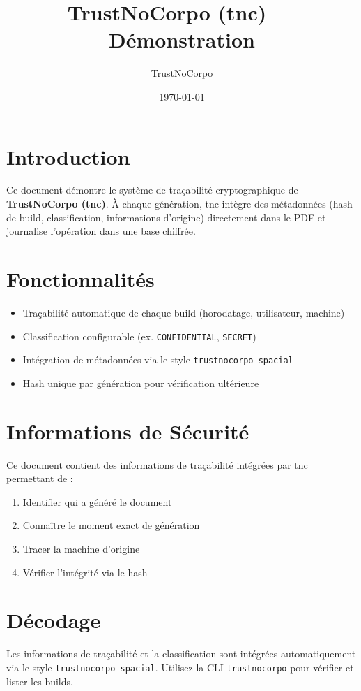 \documentclass[11pt]{article}
\title{TrustNoCorpo (tnc) — Démonstration}
\author{TrustNoCorpo}
\date{\today}
\begin{document}
\maketitle

\section{Introduction}

Ce document démontre le système de traçabilité cryptographique de \textbf{TrustNoCorpo (tnc)}. À chaque génération, tnc intègre des métadonnées (hash de build, classification, informations d'origine) directement dans le PDF et journalise l'opération dans une base chiffrée.

\section{Fonctionnalités}

\begin{itemize}
    \item Traçabilité automatique de chaque build (horodatage, utilisateur, machine)
    \item Classification configurable (ex. \texttt{CONFIDENTIAL}, \texttt{SECRET})
    \item Intégration de métadonnées via le style \texttt{trustnocorpo-spacial}
    \item Hash unique par génération pour vérification ultérieure
\end{itemize}

\section{Informations de Sécurité}

Ce document contient des informations de traçabilité intégrées par tnc permettant de :
\begin{enumerate}
    \item Identifier qui a généré le document
    \item Connaître le moment exact de génération
    \item Tracer la machine d'origine
    \item Vérifier l'intégrité via le hash
\end{enumerate}

\section{Décodage}

Les informations de traçabilité et la classification sont intégrées automatiquement via le style \texttt{trustnocorpo-spacial}. Utilisez la CLI \texttt{trustnocorpo} pour vérifier et lister les builds.
\end{document}
